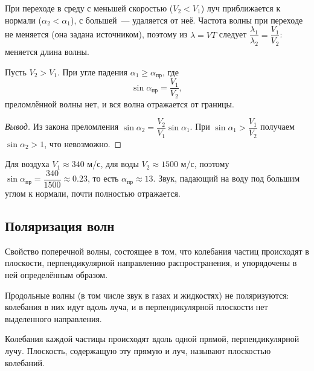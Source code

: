 \documentclass[12pt]{article}
\begin{document}
	\begin{note}
		При переходе в среду с меньшей скоростью ($V_2 < V_1$) луч приближается к нормали ($\alpha_2 < \alpha_1$), с большей~--- удаляется от неё. Частота волны при переходе не меняется (она задана источником), поэтому из $\lambda = VT$ следует $\dfrac{\lambda_1}{\lambda_2} = \dfrac{V_1}{V_2}$: меняется длина волны.
	\end{note}

	\begin{statement}
		Пусть $V_2 > V_1$. При угле падения $\alpha_1 \geqslant \alpha_{\text{пр}}$, где
		\[
			\sin \alpha_{\text{пр}} = \dfrac{V_1}{V_2},
		\]
		преломлённой волны нет, и вся волна отражается от границы.
	\end{statement}
	\begin{proof}[Вывод]
		Из закона преломления $\sin \alpha_2 = \dfrac{V_2}{V_1}\sin \alpha_1$. При $\sin \alpha_1 > \dfrac{V_1}{V_2}$ получаем $\sin \alpha_2 > 1$, что невозможно.
	\end{proof}

	\begin{example}
		Для воздуха $V_1 \approx 340$ м/с, для воды $V_2 \approx 1500$ м/с, поэтому $\sin \alpha_{\text{пр}} = \dfrac{340}{1500} \approx 0.23$, то есть $\alpha_{\text{пр}} \approx 13$\textdegree. Звук, падающий на воду под большим углом к нормали, почти полностью отражается.
	\end{example}

	\subsection{Поляризация волн}

	\begin{definition}[Поляризация]
		Свойство поперечной волны, состоящее в том, что колебания частиц происходят в плоскости, перпендикулярной направлению распространения, и упорядочены в ней определённым образом.
	\end{definition}

	\begin{note}
		Продольные волны (в том числе звук в газах и жидкостях) не поляризуются: колебания в них идут вдоль луча, и в перпендикулярной плоскости нет выделенного направления.
	\end{note}

	\begin{definition}
		Колебания каждой частицы происходят вдоль одной прямой, перпендикулярной лучу. Плоскость, содержащую эту прямую и луч, называют плоскостью колебаний.
	\end{definition}
\end{document}
